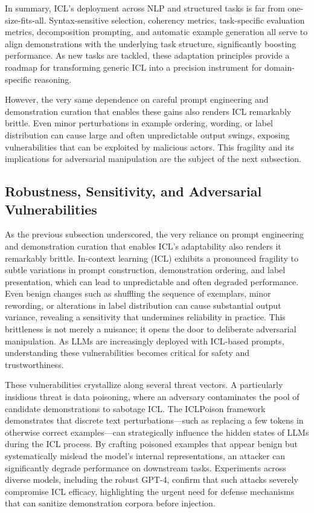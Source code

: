 \documentclass[11pt]{article}
\begin{document}
In summary, ICL's deployment across NLP and structured tasks is far from one-size-fits-all. Syntax-sensitive selection, coherency metrics, task-specific evaluation metrics, decomposition prompting, and automatic example generation all serve to align demonstrations with the underlying task structure, significantly boosting performance. As new tasks are tackled, these adaptation principles provide a roadmap for transforming generic ICL into a precision instrument for domain-specific reasoning.

However, the very same dependence on careful prompt engineering and demonstration curation that enables these gains also renders ICL remarkably brittle. Even minor perturbations in example ordering, wording, or label distribution can cause large and often unpredictable output swings, exposing vulnerabilities that can be exploited by malicious actors. This fragility and its implications for adversarial manipulation are the subject of the next subsection.

\subsection{Robustness, Sensitivity, and Adversarial Vulnerabilities}

As the previous subsection underscored, the very reliance on prompt engineering and demonstration curation that enables ICL's adaptability also renders it remarkably brittle. In-context learning (ICL) exhibits a pronounced fragility to subtle variations in prompt construction, demonstration ordering, and label presentation, which can lead to unpredictable and often degraded performance. Even benign changes such as shuffling the sequence of exemplars, minor rewording, or alterations in label distribution can cause substantial output variance, revealing a sensitivity that undermines reliability in practice. This brittleness is not merely a nuisance; it opens the door to deliberate adversarial manipulation. As LLMs are increasingly deployed with ICL-based prompts, understanding these vulnerabilities becomes critical for safety and trustworthiness.

These vulnerabilities crystallize along several threat vectors. A particularly insidious threat is data poisoning, where an adversary contaminates the pool of candidate demonstrations to sabotage ICL. The ICLPoison framework \cite{ref173} demonstrates that discrete text perturbations---such as replacing a few tokens in otherwise correct examples---can strategically influence the hidden states of LLMs during the ICL process. By crafting poisoned examples that appear benign but systematically mislead the model's internal representations, an attacker can significantly degrade performance on downstream tasks. Experiments across diverse models, including the robust GPT-4, confirm that such attacks severely compromise ICL efficacy, highlighting the urgent need for defense mechanisms that can sanitize demonstration corpora before injection.
\end{document}
